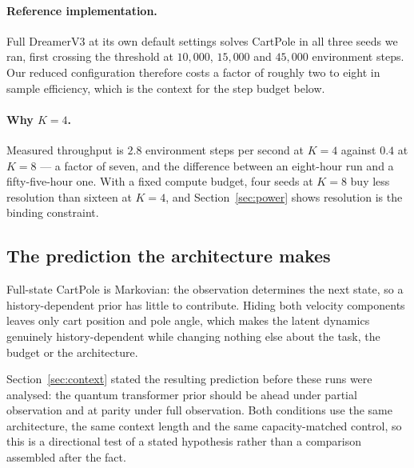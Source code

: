 \documentclass[11pt,onecolumn]{article}
\begin{document}
\paragraph{Reference implementation.}
Full DreamerV3 at its own default settings solves CartPole in all three
seeds we ran, first crossing the threshold at $10{,}000$, $15{,}000$ and
$45{,}000$ environment steps. Our reduced configuration therefore costs
a factor of roughly two to eight in sample efficiency, which is the
context for the step budget below.

\paragraph{Why $K = 4$.}
Measured throughput is $2.8$ environment steps per second at $K = 4$
against $0.4$ at $K = 8$ --- a factor of seven, and the difference
between an eight-hour run and a fifty-five-hour one. With a fixed
compute budget, four seeds at $K = 8$ buy less resolution than
sixteen at $K = 4$, and Section~\ref{sec:power} shows resolution is the
binding constraint.

\subsection{The prediction the architecture makes}
Full-state CartPole is Markovian: the observation determines the next
state, so a history-dependent prior has little to contribute. Hiding
both velocity components leaves only cart position and pole angle, which
makes the latent dynamics genuinely history-dependent while changing
nothing else about the task, the budget or the architecture.

Section~\ref{sec:context} stated the resulting prediction before these
runs were analysed: the quantum transformer prior should be ahead under
partial observation and at parity under full observation. Both
conditions use the same architecture, the same context length and the
same capacity-matched control, so this is a directional test of a
stated hypothesis rather than a comparison assembled after the fact.
\end{document}
